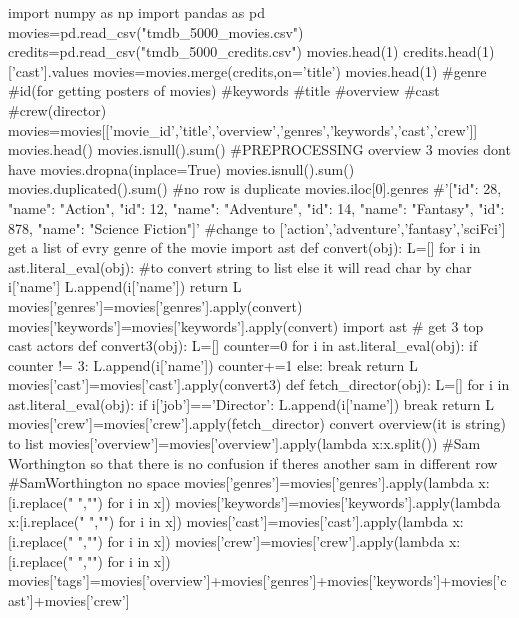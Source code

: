 import numpy as np 
import pandas as pd
movies=pd.read_csv("tmdb_5000_movies.csv")
credits=pd.read_csv("tmdb_5000_credits.csv")
movies.head(1)
credits.head(1)['cast'].values
movies=movies.merge(credits,on='title')
movies.head(1)
#genre
#id(for getting posters of movies)
#keywords
#title
#overview
#cast 
#crew(director)
movies=movies[['movie_id','title','overview','genres','keywords','cast','crew']]
movies.head()
movies.isnull().sum()
#PREPROCESSING overview 3 movies dont have
movies.dropna(inplace=True)
movies.isnull().sum()
movies.duplicated().sum()
#no row is duplicate
movies.iloc[0].genres
#'[{"id": 28, "name": "Action"}, {"id": 12, "name": "Adventure"}, {"id": 14, "name": "Fantasy"}, {"id": 878, "name": "Science Fiction"}]'
#change to ['action','adventure','fantasy','sciFci'] get a list of evry genre of the movie
import ast 
def convert(obj):
  L=[]
  for i in ast.literal_eval(obj):       #to convert string to list else it will read char by char
    i['name']
    L.append(i['name'])
  return L
  movies['genres']=movies['genres'].apply(convert)
  movies['keywords']=movies['keywords'].apply(convert)
  import ast
# get 3 top cast actors
def convert3(obj):
  L=[]
  counter=0
  for i in ast.literal_eval(obj):
    if counter != 3:
         L.append(i['name'])
         counter+=1
    else:
       break     
  return L
movies['cast']=movies['cast'].apply(convert3)
def fetch_director(obj):
  L=[]
  for i in ast.literal_eval(obj):
    if i['job']=='Director':
                L.append(i['name'])
                break
  return L
movies['crew']=movies['crew'].apply(fetch_director)
convert overview(it is string) to list 
movies['overview']=movies['overview'].apply(lambda x:x.split())
#Sam Worthington so that there is no confusion if theres another sam in different row
#SamWorthington no space
movies['genres']=movies['genres'].apply(lambda x:[i.replace(" ","") for i in x])
movies['keywords']=movies['keywords'].apply(lambda x:[i.replace(" ","") for i in x])
movies['cast']=movies['cast'].apply(lambda x:[i.replace(" ","") for i in x])
movies['crew']=movies['crew'].apply(lambda x:[i.replace(" ","") for i in x])
movies['tags']=movies['overview']+movies['genres']+movies['keywords']+movies['cast']+movies['crew']  